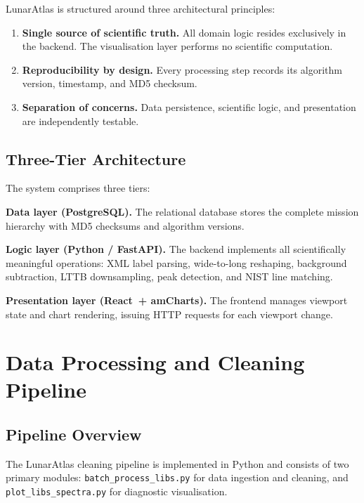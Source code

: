 \documentclass[a4paper,twocolumn,10pt]{article}
\begin{document}
LunarAtlas is structured around three architectural principles:

\begin{enumerate}[nosep,leftmargin=*]
  \item \textbf{Single source of scientific truth.}  All domain logic
    resides exclusively in the backend.  The visualisation layer
    performs no scientific computation.

  \item \textbf{Reproducibility by design.}  Every processing step
    records its algorithm version, timestamp, and MD5 checksum.

  \item \textbf{Separation of concerns.}  Data persistence, scientific
    logic, and presentation are independently testable.
\end{enumerate}

\subsection{Three-Tier Architecture}

The system comprises three tiers:

\textbf{Data layer (PostgreSQL).}  The relational database stores the
complete mission hierarchy with MD5 checksums and algorithm versions.

\textbf{Logic layer (Python / FastAPI).}  The backend implements all
scientifically meaningful operations: XML label parsing, wide-to-long
reshaping, background subtraction, LTTB downsampling, peak detection,
and NIST line matching.

\textbf{Presentation layer (React~+ amCharts).}  The frontend manages
viewport state and chart rendering, issuing HTTP requests for each
viewport change.


\section{Data Processing and Cleaning Pipeline}
\label{sec:processing}

\subsection{Pipeline Overview}

The LunarAtlas cleaning pipeline is implemented in Python and consists
of two primary modules: \texttt{batch\_process\_libs.py} for data
ingestion and cleaning, and \texttt{plot\_libs\_spectra.py} for
diagnostic visualisation.
\end{document}
